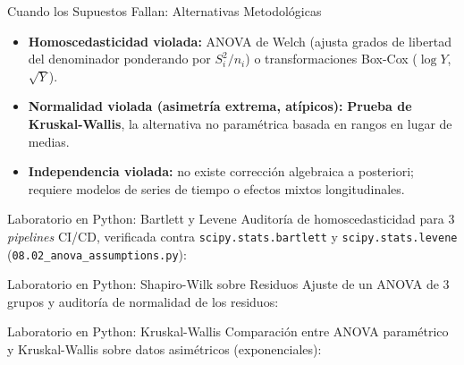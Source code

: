 \documentclass[10pt, aspectratio=169]{beamer}
\begin{document}
\begin{frame}{Cuando los Supuestos Fallan: Alternativas Metodológicas}
  \footnotesize
  \begin{itemize}\itemsep=0.1cm
    \item \textbf{Homoscedasticidad violada:} ANOVA de Welch (ajusta grados de libertad del denominador ponderando por $S_i^2/n_i$) o transformaciones Box-Cox ($\log Y$, $\sqrt{Y}$). \pause
    \item \textbf{Normalidad violada (asimetría extrema, atípicos):} \textbf{Prueba de Kruskal-Wallis}, la alternativa no paramétrica basada en rangos en lugar de medias. \pause
    \item \textbf{Independencia violada:} no existe corrección algebraica a posteriori; requiere modelos de series de tiempo o efectos mixtos longitudinales.
  \end{itemize}
\end{frame}

\begin{frame}[fragile]{Laboratorio en Python: Bartlett y Levene}
  \scriptsize
  Auditoría de homoscedasticidad para 3 \emph{pipelines} CI/CD, verificada contra \texttt{scipy.stats.bartlett} y \texttt{scipy.stats.levene} (\texttt{08.02\_anova\_assumptions.py}):
  {
  }
\end{frame}

\begin{frame}[fragile]{Laboratorio en Python: Shapiro-Wilk sobre Residuos}
  \scriptsize
  Ajuste de un ANOVA de 3 grupos y auditoría de normalidad de los residuos:
  {
  }
\end{frame}

\begin{frame}[fragile]{Laboratorio en Python: Kruskal-Wallis}
  \scriptsize
  Comparación entre ANOVA paramétrico y Kruskal-Wallis sobre datos asimétricos (exponenciales):
  {
  }
\end{frame}
\end{document}
